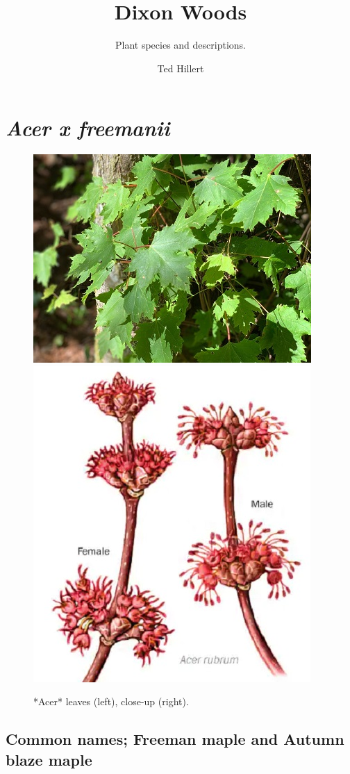 \documentclass[
]{article}
\title{Dixon Woods}
\subtitle{Plant species and descriptions.}
\author{Ted Hillert}
\date{}
\begin{document}
\maketitle

{
\setcounter{tocdepth}{2}
\tableofcontents
}
\hypertarget{acer-x-freemanii}{%
\section{\texorpdfstring{\emph{Acer x freemanii}}{Acer x freemanii}}\label{acer-x-freemanii}}

\begin{figure}

{\centering \includegraphics[width=0.5\linewidth]{acer1} \includegraphics[width=0.5\linewidth]{redmap} 

}

\caption{*Acer* leaves (left), close-up (right).}\label{fig:maple}
\end{figure}

\hypertarget{common-names-freeman-maple-and-autumn-blaze-maple}{%
\subsection{Common names; Freeman maple and Autumn blaze maple}\label{common-names-freeman-maple-and-autumn-blaze-maple}}
\end{document}
